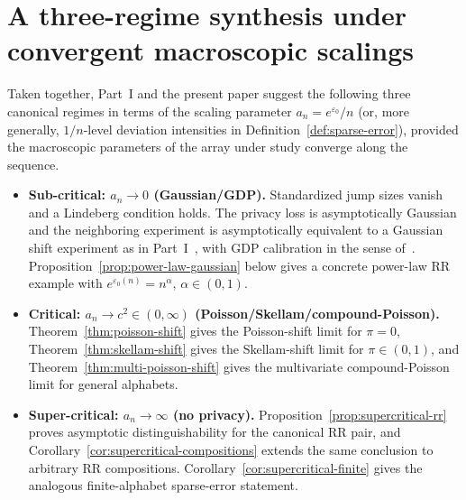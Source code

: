\documentclass{article}
\begin{document}
\section{A three-regime synthesis under convergent macroscopic scalings}

Taken together, Part~I and the present paper suggest the following three canonical regimes in terms
of the scaling parameter $a_n = e^{\varepsilon_0}/n$ (or, more generally, $1/n$-level deviation
intensities in Definition~\ref{def:sparse-error}), provided the macroscopic parameters of the array
under study converge along the sequence.

\begin{itemize}
\item \textbf{Sub-critical: $a_n \to 0$ (Gaussian/GDP).} Standardized jump sizes vanish and a Lindeberg
condition holds. The privacy loss is asymptotically Gaussian and the neighboring experiment is
asymptotically equivalent to a Gaussian shift experiment as in Part~I~\cite{Shv26}, with GDP
calibration in the sense of~\cite{DRS22}. Proposition~\ref{prop:power-law-gaussian} below gives a
concrete power-law RR example with $e^{\varepsilon_0(n)} = n^\alpha$, $\alpha \in (0,1)$.
\item \textbf{Critical: $a_n \to c^2 \in (0,\infty)$ (Poisson/Skellam/compound-Poisson).}
Theorem~\ref{thm:poisson-shift} gives the Poisson-shift limit for $\pi = 0$,
Theorem~\ref{thm:skellam-shift} gives the Skellam-shift limit for $\pi \in (0,1)$, and
Theorem~\ref{thm:multi-poisson-shift} gives the multivariate compound-Poisson limit for general alphabets.
\item \textbf{Super-critical: $a_n \to \infty$ (no privacy).} Proposition~\ref{prop:supercritical-rr}
proves asymptotic distinguishability for the canonical RR pair, and
Corollary~\ref{cor:supercritical-compositions} extends the same conclusion to arbitrary RR compositions.
Corollary~\ref{cor:supercritical-finite} gives the analogous finite-alphabet sparse-error statement.
\end{itemize}
\end{document}
